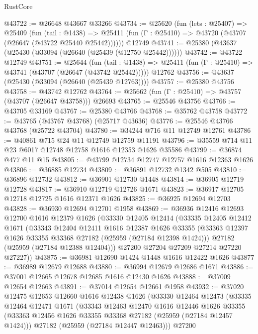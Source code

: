 \begin{lexlean}{RustCore}
\begin{coremodule}
@43722 := @26648 @43667 @33266
@43734 := @25620
    (fun (lets : @25407) =>
    @25409
      (fun (tail : @1438) =>
      @25411 (fun (Γ : @25410) => @43720 (@43707 (@26647 (@43722 @25440 @25442))))))
    @12749
@43741 := @25380 (@43637 (@25430 (@33094 (@26640 (@25439 (@12750 @25442))))))
@43742 := @43722 @12749
@43751 := @25644
    (fun (tail : @1438) => @25411 (fun (Γ : @25410) => @43741 (@43707 (@26647 (@43742 @25442)))))
    @12762
@43756 := @43637 (@25430 (@33094 (@26640 (@25439 @12763))))
@43757 := @25380 @43756
@43758 := @43742 @12762
@43764 := @25662 (fun (Γ : @25410) => @43757 (@43707 (@26647 @43758))) @26693
@43765 := @25546 @43756
@43766 := @43705 @33169
@43767 := @25380 @43766
@43768 := @35762 @43758
@43772 := @43765 (@43767 @43768) (@25717 @43636)
@43776 := @25546 @43766 @43768 (@25722 @43704)
@43780 := @34244 @716 @11 @12749 @12761
@43786 := @40861 @715 @24 @11 @12749 @12759 @11191
@43796 := @35559 @714 @11 @23 @6017 @12748 @12758 @1616 @12353 @1626 @35586
@43799 := @36874 @477 @11 @15
@43805 := @43799 @12734 @12747 @12757 @1616 @12363 @1626
@43806 := @36885 @12734
@43809 := @36891 @12732 @1342 @505
@43810 := @36896 @12732
@43812 := @36901 @12730 @1448
@43814 := @36905 @12719 @12728
@43817 := @36910 @12719 @12726 @1671
@43823 := @36917 @12705 @12718 @12725 @1616 @12371 @1626
@43825 := @36925 @12694 @12703
@43828 := @36930 @12694 @12701 @1958
@43869 := @36936
    @12416
    @12693
    @12700
    @1616
    @12379
    @1626
    (@33330
      @12405
      @12414
      (@33335
        @12405
        @12412
        @1671
        (@33343
          @12404
          @12411
          @1616
          @12387
          @1626
          @33355
          (@33363 @12397 @1626 @33355 @33368 @27182 (@25959 (@27184 @12398 @1424)))
          @27182
          (@25959 (@27184 @12388 @12404)))
        @27200
        @27204
        @27209
        @27214
        @27220
        @27227))
@43875 := @36981 @12690 @1424 @1448 @1616 @12422 @1626
@43877 := @36989 @12679 @12688
@43880 := @36994 @12679 @12686 @1671
@43886 := @37001 @12665 @12678 @12685 @1616 @12430 @1626
@43888 := @37009 @12654 @12663
@43891 := @37014 @12654 @12661 @1958
@43932 := @37020
    @12475
    @12653
    @12660
    @1616
    @12438
    @1626
    (@33330
      @12464
      @12473
      (@33335
        @12464
        @12471
        @1671
        (@33343
          @12463
          @12470
          @1616
          @12446
          @1626
          @33355
          (@33363 @12456 @1626 @33355 @33368 @27182 (@25959 (@27184 @12457 @1424)))
          @27182
          (@25959 (@27184 @12447 @12463)))
        @27200

\end{coremodule}
\end{lexlean}
